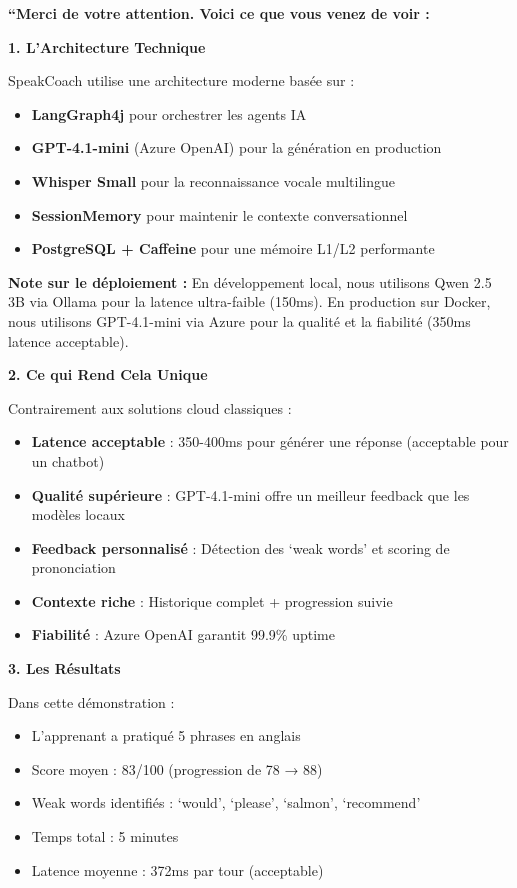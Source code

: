 \documentclass[12pt,a4paper,oneside]{report}
\begin{document}
\begin{tcolorbox}[colback=darkblue!10, colframe=darkblue, title=\textbf{SCRIPT DE CONCLUSION}]

\textbf{``Merci de votre attention. Voici ce que vous venez de voir :}

\textbf{1. L'Architecture Technique}

SpeakCoach utilise une architecture moderne basée sur :
\begin{itemize}
    \item \textbf{LangGraph4j} pour orchestrer les agents IA
    \item \textbf{GPT-4.1-mini} (Azure OpenAI) pour la génération en production
    \item \textbf{Whisper Small} pour la reconnaissance vocale multilingue
    \item \textbf{SessionMemory} pour maintenir le contexte conversationnel
    \item \textbf{PostgreSQL + Caffeine} pour une mémoire L1/L2 performante
\end{itemize}

\textbf{Note sur le déploiement :} En développement local, nous utilisons Qwen 2.5 3B via Ollama 
pour la latence ultra-faible (150ms). En production sur Docker, nous utilisons GPT-4.1-mini via Azure 
pour la qualité et la fiabilité (350ms latence acceptable).

\textbf{2. Ce qui Rend Cela Unique}

Contrairement aux solutions cloud classiques :
\begin{itemize}
    \item \textbf{Latence acceptable} : 350-400ms pour générer une réponse (acceptable pour un chatbot)
    \item \textbf{Qualité supérieure} : GPT-4.1-mini offre un meilleur feedback que les modèles locaux
    \item \textbf{Feedback personnalisé} : Détection des `weak words' et scoring de prononciation
    \item \textbf{Contexte riche} : Historique complet + progression suivie
    \item \textbf{Fiabilité} : Azure OpenAI garantit 99.9\% uptime
\end{itemize}

\textbf{3. Les Résultats}

Dans cette démonstration :
\begin{itemize}
    \item L'apprenant a pratiqué 5 phrases en anglais
    \item Score moyen : 83/100 (progression de 78 → 88)
    \item Weak words identifiés : `would', `please', `salmon', `recommend'
    \item Temps total : 5 minutes
    \item Latence moyenne : 372ms par tour (acceptable)
\end{itemize}


\end{tcolorbox}
\end{document}
